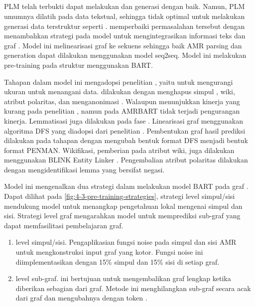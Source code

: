 \subsection{ }

\Gls{PLM} telah terbukti dapat melakukan  \amrparsing{} dan generasi \AMRtoTEXT{} dengan baik.
Namun, \gls{PLM} umumnya dilatih pada data tekstual, sehingga tidak optimal untuk melakukan generasi data terstruktur seperti \AMR{}.
\textcite{bai2022} memperbaiki permasalahan tersebut dengan menambahkan strategi \pretraining{} pada model untuk mengintegrasikan informasi teks dan graf \AMR{}.
Model ini melinearisasi graf \AMR{} ke sekuens sehingga baik AMR parsing dan \AMRtoTEXT{} generation dapat dilakukan menggunakan model \gls{seq2seq}.
Model ini melakukan pre-training pada struktur \AMR{} menggunakan \gls{BART}.

Tahapan  dalam model ini mengadopsi penelitian \textcite{bevilacqua2021}, yaitu  untuk mengurangi ukuran  untuk menangani  data.
 dilakukan dengan menghapus simpul ,  wiki, atribut polaritas, dan menganonimasi .
Walaupun  menunjukkan kinerja yang kurang pada penelitian \textcite{bevilacqua2021}, namun pada \gls{AMRBART} tidak terjadi pengurangan kinerja.
Lemmatisasi juga dilakukan pada fase .
Linearisasi graf menggunakan algoritma \gls{DFS} yang diadopsi dari penelitian \textcite{bevilacqua2021}.
Pembentukan graf \AMR{} hasil prediksi dilakukan pada tahapan  dengan mengubah bentuk format \gls{DFS} menjadi bentuk format PENMAN.
Wikifikasi, pemberian  pada atribut wiki, juga dilakukan menggunakan BLINK Entity Linker .
Pengembalian atribut polaritas dilakukan dengan mengidentifikasi lemma yang bersifat negasi.

Model ini mengenalkan dua strategi  dalam melakukan \pretraining{} model \gls{BART} pada graf \AMR{}.
Dapat dilihat pada \cref{fig:4-3-pre-training-strategies}, strategi level \denoising{} simpul/sisi mendukung model untuk menangkap pengetahuan lokal mengenai simpul dan sisi.
Strategi \denoising{} level graf mengarahkan model untuk memprediksi sub-graf yang dapat memfasilitasi pembelajaran graf.
\begin{enumerate}
  \item \Denoising{} level simpul/sisi.
  Pengaplikasian fungsi noise pada simpul dan sisi AMR untuk mengkonstruksi input graf yang kotor.
  Fungsi noise ini diimplementasikan dengan  15\% simpul dan 15\% sisi di setiap graf.

  \item \Denoising{} level sub-graf.
   ini bertujuan untuk mengembalikan graf lengkap ketika diberikan sebagian dari graf.
  Metode ini menghilangkan sub-graf secara acak dari graf dan mengubahnya dengan token .
\end{enumerate}

